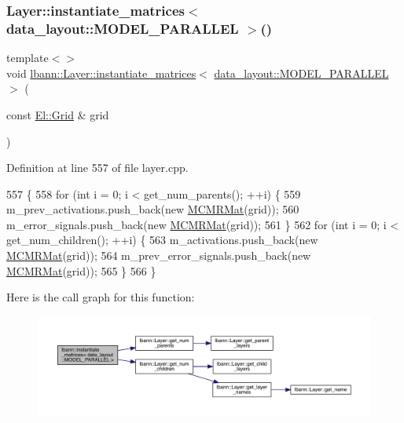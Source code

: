 \subsubsection{\texorpdfstring{Layer\+::instantiate\+\_\+matrices$<$ data\+\_\+layout\+::\+M\+O\+D\+E\+L\+\_\+\+P\+A\+R\+A\+L\+L\+E\+L $>$()}{Layer::instantiate\_matrices< data\_layout::MODEL\_PARALLEL >()}}
{\footnotesize\ttfamily template$<$$>$ \\
void \hyperlink{classlbann_1_1Layer_a2d50e9af2a9aa7e6741deb555641c30c}{lbann\+::\+Layer\+::instantiate\+\_\+matrices}$<$ \hyperlink{base_8hpp_a786677cbfb3f5677b4d84f3056eb08dbac94d7b0e44ab8bdcdad694a673cdeae0}{data\+\_\+layout\+::\+M\+O\+D\+E\+L\+\_\+\+P\+A\+R\+A\+L\+L\+EL} $>$ (\begin{DoxyParamCaption}\item[{const \hyperlink{base_8hpp_a9951bb1719d534e0401b1f06cad19eab}{El\+::\+Grid} \&}]{grid }\end{DoxyParamCaption})}



Definition at line 557 of file layer.\+cpp.


\begin{DoxyCode}
557                                                                               \{
558   \textcolor{keywordflow}{for} (\textcolor{keywordtype}{int} i = 0; i < get\_num\_parents(); ++i) \{
559     m\_prev\_activations.push\_back(\textcolor{keyword}{new} \hyperlink{base_8hpp_a50f80e25e2fbefe6b32d270b8d4f8d19}{MCMRMat}(grid));
560     m\_error\_signals.push\_back(\textcolor{keyword}{new} \hyperlink{base_8hpp_a50f80e25e2fbefe6b32d270b8d4f8d19}{MCMRMat}(grid));
561   \}
562   \textcolor{keywordflow}{for} (\textcolor{keywordtype}{int} i = 0; i < get\_num\_children(); ++i) \{
563     m\_activations.push\_back(\textcolor{keyword}{new} \hyperlink{base_8hpp_a50f80e25e2fbefe6b32d270b8d4f8d19}{MCMRMat}(grid));
564     m\_prev\_error\_signals.push\_back(\textcolor{keyword}{new} \hyperlink{base_8hpp_a50f80e25e2fbefe6b32d270b8d4f8d19}{MCMRMat}(grid));
565   \}
566 \}
\end{DoxyCode}
Here is the call graph for this function\+:\nopagebreak
\begin{figure}[H]
\begin{center}
\leavevmode
\includegraphics[width=350pt]{namespacelbann_a32006e2c89920b1ff6e8a2318650dd7f_cgraph}
\end{center}
\end{figure}
\mbox{\label{namespacelbann_aedccb3bf2d674ccb5573ab9960720731}} 
